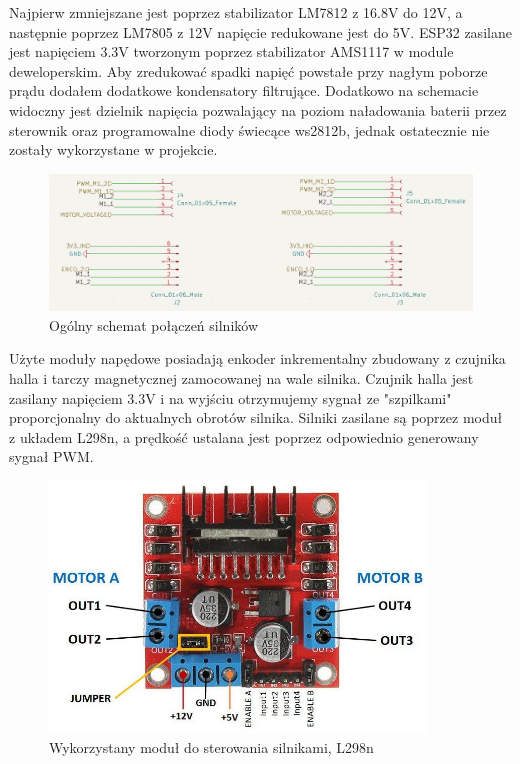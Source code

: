 Najpierw zmniejszane jest poprzez stabilizator LM7812 z 16.8V do 12V, a następnie poprzez LM7805 z 12V napięcie redukowane jest do 5V. 
ESP32 zasilane jest napięciem 3.3V tworzonym poprzez stabilizator AMS1117 w module deweloperskim. 
Aby zredukować spadki napięć powstałe przy nagłym poborze prądu dodałem dodatkowe kondensatory filtrujące. 
Dodatkowo na schemacie widoczny jest dzielnik napięcia pozwalający na poziom naładowania baterii przez sterownik oraz programowalne diody świecące ws2812b,
jednak ostatecznie nie zostały wykorzystane w projekcie.
\begin{figure}[H]
	\centering
	\includegraphics[width=16cm]{pages/robot/zdjecia/kicad/schematSilniki.png}
	\caption{Ogólny schemat połączeń silników}
	\label{Fig:Rysunek}
\end{figure}
Użyte moduły napędowe posiadają enkoder inkrementalny zbudowany z czujnika halla i tarczy magnetycznej zamocowanej na wale silnika.
Czujnik halla jest zasilany napięciem 3.3V i na wyjściu otrzymujemy sygnał ze "szpilkami" proporcjonalny do aktualnych obrotów silnika. 
Silniki zasilane są poprzez moduł z układem L298n, a prędkość ustalana jest poprzez odpowiednio generowany sygnał PWM. 
\begin{figure}[H]
	\centering
	\includegraphics[width=10cm]{pages/robot/zdjecia/l298n_modul.jpg}
	\caption{Wykorzystany moduł do sterowania silnikami, L298n}
	\label{Fig:Rysunek}
\end{figure}

